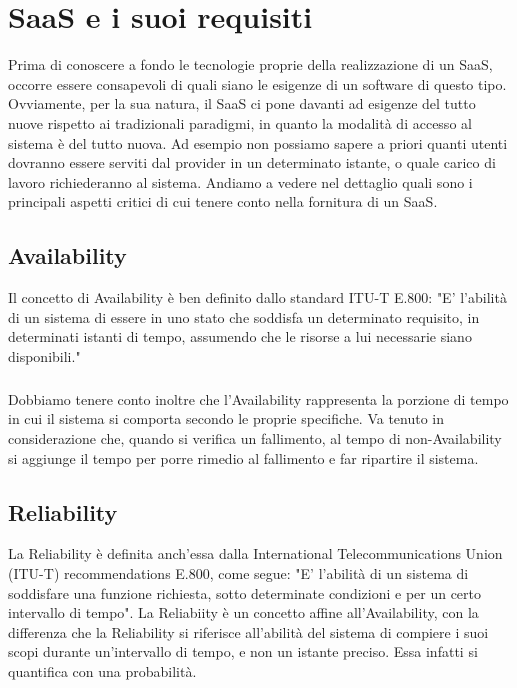 \chapter{SaaS e i suoi requisiti}
Prima di conoscere a fondo le tecnologie proprie della realizzazione di un SaaS, occorre essere consapevoli di quali siano le esigenze di un software di questo tipo. Ovviamente, per la sua natura, il SaaS ci pone davanti ad esigenze del tutto nuove rispetto ai tradizionali paradigmi, in quanto la modalità di accesso al sistema è del tutto nuova. Ad esempio non possiamo sapere a priori quanti utenti dovranno essere serviti dal provider in un determinato istante, o quale carico di lavoro richiederanno al sistema. Andiamo a vedere nel dettaglio quali sono i principali aspetti critici di cui tenere conto nella fornitura di un SaaS.

\section{Availability}
Il concetto di Availability è ben definito dallo standard ITU-T E.800: "E' l'abilità di un sistema di essere in uno stato che soddisfa un determinato requisito, in determinati istanti di tempo, assumendo che le risorse a lui necessarie siano disponibili." 

\paragraph{}
Dobbiamo tenere conto inoltre che l'Availability rappresenta la porzione di tempo in cui il sistema si comporta secondo le proprie specifiche. Va tenuto in considerazione che, quando si verifica un fallimento, al tempo di non-Availability si aggiunge il tempo per porre rimedio al fallimento e far ripartire il sistema. 

\section{Reliability}
La Reliability è definita anch'essa dalla International Telecommunications Union (ITU-T) recommendations E.800, come segue: "E' l'abilità di un sistema di soddisfare una funzione richiesta, sotto determinate condizioni e per un certo intervallo di tempo". La Reliabiity è un concetto affine all'Availability, con la differenza che la Reliability si riferisce all'abilità del sistema di compiere i suoi scopi durante un'intervallo di tempo, e non un istante preciso. Essa infatti si quantifica con una probabilità.

